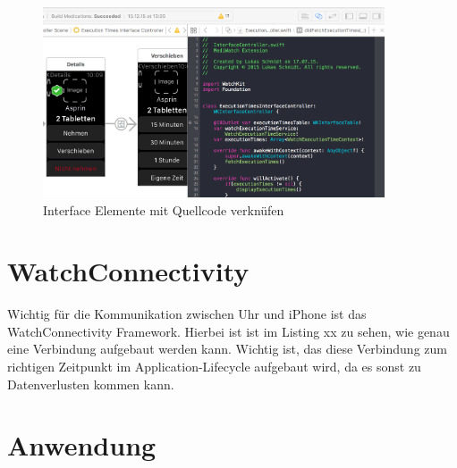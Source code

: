 \begin{figure}
	\caption{Interface Elemente mit Quellcode verknüfen}
	\label{fig:xcode-interface-code-connect}
	\centering
	\includegraphics[width=0.9\textwidth]{04_realisation/screenshots/xcode-interface-code-connect}
\end{figure}

\section{WatchConnectivity}
Wichtig für die Kommunikation zwischen Uhr und iPhone ist das WatchConnectivity Framework. Hierbei ist ist im Listing xx zu sehen, wie genau eine Verbindung aufgebaut werden kann. Wichtig ist, das diese Verbindung zum richtigen Zeitpunkt im Application-Lifecycle aufgebaut wird, da es sonst zu Datenverlusten kommen kann.



\section{Anwendung}
